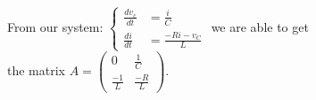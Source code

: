 \documentclass[preview]{standalone}
\begin{document}
\begin{center}
\raggedright
                    From our system: 
                    \(\left\{
                    \begin{aligned}
                        \frac{dv_c}{dt} &= \frac{i}{C} \\
                        \frac{di}{dt} &= \frac{-Ri - v_C}{L}
                    \end{aligned}
                    \right.\) we are able to get \\[5pt]
                    the matrix \(A = \begin{pmatrix}
                                0 & \frac{1}{C} \\
                                \frac{-1}{L} & \frac{-R}{L}
                            \end{pmatrix}\).
\end{center}
\end{document}
